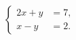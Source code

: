 \documentclass{article}
\begin{document}
\[
\left\{
\begin{aligned}
  2x+y &= 7,\\
  x-y  &= 2.
\end{aligned}
\right.
\]
\end{document}
